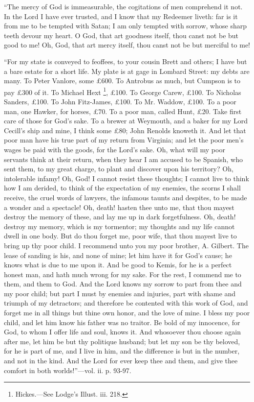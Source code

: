 ``The mercy of God is immeasurable,
the cogitations of men comprehend it not. In the Lord I have ever
trusted, and I know that my Redeemer liveth: far is it from me to be
tempted with Satan; I am only tempted with sorrow, whose sharp teeth
devour my heart. O God, that art goodness itself, thou canst not be but
good to me! Oh, God, that art mercy itself, thou canst not be but
merciful to me!

``For my state is conveyed to
feoffees, to your cousin Brett and others; I have but a bare estate for
a short life. My plate is at gage in Lombard Street: my debts are many.
To Peter Vanlore, some £600. To Antrobus as much, but Cumpson is to pay
£300 of it. To Michael Hext \footnote{Hickes.—See Lodge's Illust. iii. 218.}, £100. To George Carew, £100. To Nicholas
Sanders, £100. To John Fitz-James, £100. To Mr. Waddow, £100. To a
poor man, one Hawker, for horses, £70. To a poor man, called Hunt, £20.
Take first care of those for God's sake. To a brewer at Weymouth, and a
baker for my Lord Cecill's ship and mine, I think some £80; John
Renolds knoweth it. And let that poor man have his true part of my
return from Virginia; and let the poor men's wages be paid with the
goods, for the Lord's sake. Oh, what will my poor servants think at
their return, when they hear I am accused to be Spanish, who sent them,
to my great charge, to plant and discover upon his territory? Oh,
intolerable infamy! Oh, God! I cannot resist these thoughts; I cannot
live to think how I am derided, to think of the expectation of my
enemies, the scorns I shall receive, the cruel words of lawyers, the
infamous taunts and despites, to be made a wonder and a spectacle! Oh,
death! hasten thee unto me, that thou mayest destroy the memory of
these, and lay me up in dark forgetfulness. Oh, death! destroy my
memory, which is my tormentor; my thoughts and my life cannot dwell in
one body. But do thou forget me, poor wife, that thou mayest live to
bring up thy poor child. I recommend unto you my poor brother, A.
Gilbert. The lease of sanding is his, and none of mine; let him have it
for God's cause; he knows what is due to me upon it. And be good to
Kemis, for he is a perfect honest man, and hath much wrong for my
sake. For the rest, I commend me to them, and them
to God. And the Lord knows my sorrow to part from thee and my poor
child; but part I must by enemies and injuries, part with shame and
triumph of my detractors; and therefore be contented with this work of
God, and forget me in all things but thine own honor, and the love of
mine. I bless my poor child, and let him know his father was no traitor.
Be bold of my innocence, for God, to whom I offer life and soul, knows
it. And whosoever thou choose again after me, let him be but thy
politique husband; but let my son be thy beloved, for he is part of me,
and I live in him, and the difference is but in the number, and not in
the kind. And the Lord for ever keep thee and them, and give thee
comfort in both worlds!''—vol. ii. p. 93-97.

